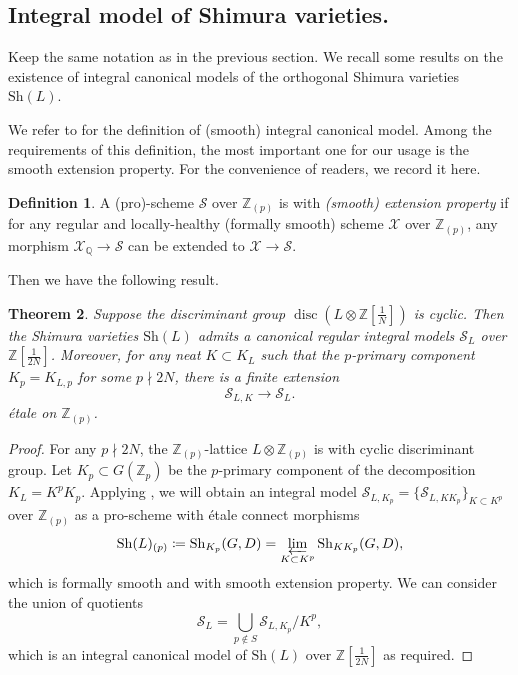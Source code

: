\documentclass[11pt,reqno,oneside]{amsart}
\numberwithin{equation}{section}
\newtheorem{theorem}{Theorem}[section]
\theoremstyle{definition}
\newtheorem{definition}[theorem]{Definition}
\DeclareMathOperator{\disc}{disc}
\newcommand{\Sh}{\mathrm{Sh}}
\newcommand{\scS}{\mathscr{S}}
\newcommand{\QQ}{\mathbb{Q}}
\newcommand{\ZZ}{\mathbb{Z}}
\begin{document}
\subsection{Integral model of Shimura varieties.}\label{subsec:IntegralModel}
Keep the same notation as in the previous section. We recall some results on the existence of integral canonical models of the orthogonal Shimura varieties $\Sh(L)$.

We refer to \cite[Definition 4.2]{Pe16} for the definition of (smooth) integral canonical model. Among the requirements of this definition, the most important one for our usage is the smooth extension property. For the convenience of readers, we record it here.
\begin{definition}\label{def:extensionproperty}
A (pro)-scheme $\mathscr{S}$ over $\ZZ_{(p)}$ is with \emph{(smooth) extension property} if for any regular and locally-healthy (formally smooth) scheme $\mathscr{X}$ over $\ZZ_{(p)}$, any morphism $\mathscr{X}_{\QQ} \to \mathscr{S}$ can be extended to $\mathscr{X} \to \scS$. 
\end{definition}



Then we have the following result.
\begin{theorem}\label{integral-model}
Suppose the discriminant group $\disc(L\otimes \ZZ[\frac{1}{N}])$ is cyclic. Then the Shimura varieties $\Sh(L)$ admits a canonical regular integral models $\scS_{L}$  over $\ZZ[\frac{1}{2N}]$. Moreover, for any neat $K \subset K_{L}$ such that the $p$-primary component $K_p = K_{L,p}$ for some $p \nmid 2N$, there is a finite extension
\[
\scS_{L,K} \to  \scS_{L}.
\]
\'etale on $\ZZ_{(p)}$.
\end{theorem}

\begin{proof}



For any $p \nmid 2N$, the $\ZZ_{(p)}$-lattice $L \otimes \ZZ_{(p)}$ is with cyclic discriminant group.  Let $K_p \subset G(\ZZ_p)$ be the $p$-primary component of the decomposition $K_{L} = K^pK_p$. Applying \cite[Theorem 4.4]{Pe16}, we will obtain an integral model $\scS_{L,K_p} = \{\scS_{L,KK_p}\}_{K \subset K^p}$ over $\ZZ_{(p)}$ as a pro-scheme with \'etale connect morphisms
\[ 
\Sh(L)_{(p)} \coloneqq \Sh_{K_p}(G,D) = \varprojlim_{K \subset K^p} \Sh_{K K_p} (G,D),
\]
 which is formally smooth and with smooth extension property.
 We can consider the union of quotients
\[
\scS_{L} = \bigcup_{p \notin S} \scS_{L,K_p}/{K^p},
\]
which is an integral canonical model of $\Sh(L)$ over $\ZZ[\frac{1}{2N}]$ as required.
\end{proof}
\end{document}
